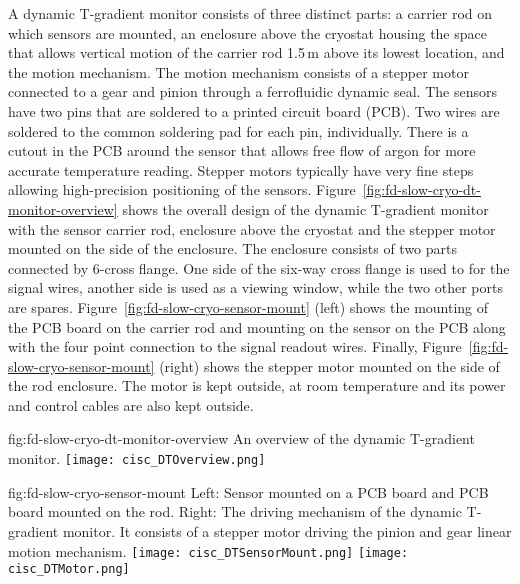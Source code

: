 A dynamic T-gradient monitor consists of three distinct parts: a carrier rod on which sensors are mounted, an enclosure above the cryostat housing the space that allows vertical motion of the carrier rod 1.5\,m above its lowest location, and the motion mechanism. The motion mechanism consists of a stepper motor connected to a gear and pinion through a ferrofluidic dynamic seal. The sensors have two pins that are soldered to a printed circuit board (PCB). Two wires are soldered to the common soldering pad for each pin, individually.   There is a cutout in the PCB around the sensor that allows free flow of argon for more accurate temperature reading.  Stepper motors typically have very fine steps allowing high-precision positioning of the sensors.  Figure~\ref{fig:fd-slow-cryo-dt-monitor-overview} shows the overall design of the dynamic T-gradient monitor with the sensor carrier rod, enclosure above the cryostat and the stepper motor mounted on the side of the enclosure. The enclosure consists of two parts connected by 6-cross flange. One side of the six-way cross flange is used to for the signal wires, another side is used as a viewing window, while the two other ports are spares. Figure~\ref{fig:fd-slow-cryo-sensor-mount} (left) shows the mounting of the PCB board on the carrier rod and mounting on the sensor on the PCB along with the four point connection to the signal readout wires. Finally, Figure~\ref{fig:fd-slow-cryo-sensor-mount} (right) shows the stepper motor mounted on the side of the rod enclosure. The motor is kept outside, at room temperature and its power and control cables are also kept outside.

\begin{dunefigure}{fig:fd-slow-cryo-dt-monitor-overview}
  {An overview of the dynamic T-gradient monitor.}
 \texttt{[image: cisc\_DTOverview.png]}
\end{dunefigure}
\begin{dunefigure}{fig:fd-slow-cryo-sensor-mount}
  {Left: Sensor mounted on a PCB board and PCB board mounted on the rod. Right:
    The driving mechanism of the dynamic T-gradient monitor. It consists of a stepper motor driving the pinion and gear linear motion mechanism. }
  \texttt{[image: cisc\_DTSensorMount.png]}
  \hspace{3cm}%
  \texttt{[image: cisc\_DTMotor.png]}
\end{dunefigure}

